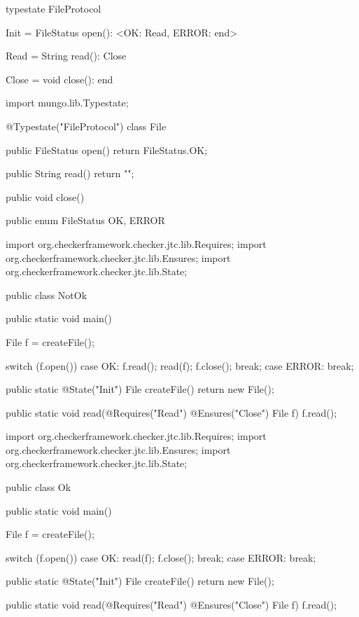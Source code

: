 \begin{code}
typestate FileProtocol {

  Init = {
    FileStatus open(): <OK: Read, ERROR: end>
  }

  Read = {
    String read(): Close
  }

  Close = {
    void close(): end
  }

}\end{code}

\begin{code}
import mungo.lib.Typestate;

@Typestate("FileProtocol")
class File {

  public FileStatus open() {
    return FileStatus.OK;
  }

  public String read() {
    return "";
  }

  public void close() {
  }

}\end{code}

\begin{code}
public enum FileStatus {
  OK, ERROR
}\end{code}

\begin{code}
import org.checkerframework.checker.jtc.lib.Requires;
import org.checkerframework.checker.jtc.lib.Ensures;
import org.checkerframework.checker.jtc.lib.State;

public class NotOk {

  public static void main() {
    File f = createFile();

    switch (f.open()) {
      case OK:
        f.read();
        read(f);
        f.close();
        break;
      case ERROR:
        break;
    }
  }

  public static @State("Init") File createFile() {
    return new File();
  }

  public static void read(@Requires("Read") @Ensures("Close") File f) {
    f.read();
  }

}\end{code}

\begin{code}
import org.checkerframework.checker.jtc.lib.Requires;
import org.checkerframework.checker.jtc.lib.Ensures;
import org.checkerframework.checker.jtc.lib.State;

public class Ok {

  public static void main() {
    File f = createFile();

    switch (f.open()) {
      case OK:
        read(f);
        f.close();
        break;
      case ERROR:
        break;
    }
  }

  public static @State("Init") File createFile() {
    return new File();
  }

  public static void read(@Requires("Read") @Ensures("Close") File f) {
    f.read();
  }

}\end{code}

